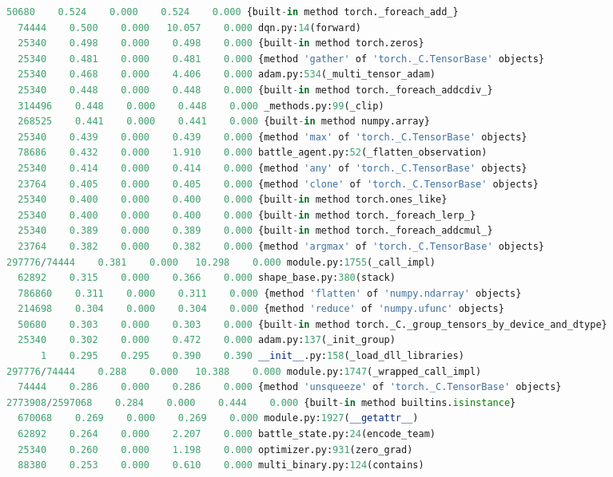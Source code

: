 \begin{changemargin}{-2cm}{-2cm}
\begin{lstlisting}[basicstyle=\fontsize{8}{8}\selectfont\ttfamily,language=Python,caption={Excerpt of custom environment implementation cProfile sorted by time.}]
  50680    0.524    0.000    0.524    0.000 {built-in method torch._foreach_add_}
  74444    0.500    0.000   10.057    0.000 dqn.py:14(forward)
  25340    0.498    0.000    0.498    0.000 {built-in method torch.zeros}
  25340    0.481    0.000    0.481    0.000 {method 'gather' of 'torch._C.TensorBase' objects}
  25340    0.468    0.000    4.406    0.000 adam.py:534(_multi_tensor_adam)
  25340    0.448    0.000    0.448    0.000 {built-in method torch._foreach_addcdiv_}
  314496    0.448    0.000    0.448    0.000 _methods.py:99(_clip)
  268525    0.441    0.000    0.441    0.000 {built-in method numpy.array}
  25340    0.439    0.000    0.439    0.000 {method 'max' of 'torch._C.TensorBase' objects}
  78686    0.432    0.000    1.910    0.000 battle_agent.py:52(_flatten_observation)
  25340    0.414    0.000    0.414    0.000 {method 'any' of 'torch._C.TensorBase' objects}
  23764    0.405    0.000    0.405    0.000 {method 'clone' of 'torch._C.TensorBase' objects}
  25340    0.400    0.000    0.400    0.000 {built-in method torch.ones_like}
  25340    0.400    0.000    0.400    0.000 {built-in method torch._foreach_lerp_}
  25340    0.389    0.000    0.389    0.000 {built-in method torch._foreach_addcmul_}
  23764    0.382    0.000    0.382    0.000 {method 'argmax' of 'torch._C.TensorBase' objects}
297776/74444    0.381    0.000   10.298    0.000 module.py:1755(_call_impl)
  62892    0.315    0.000    0.366    0.000 shape_base.py:380(stack)
  786860    0.311    0.000    0.311    0.000 {method 'flatten' of 'numpy.ndarray' objects}
  214698    0.304    0.000    0.304    0.000 {method 'reduce' of 'numpy.ufunc' objects}
  50680    0.303    0.000    0.303    0.000 {built-in method torch._C._group_tensors_by_device_and_dtype}
  25340    0.302    0.000    0.472    0.000 adam.py:137(_init_group)
      1    0.295    0.295    0.390    0.390 __init__.py:158(_load_dll_libraries)
297776/74444    0.288    0.000   10.388    0.000 module.py:1747(_wrapped_call_impl)
  74444    0.286    0.000    0.286    0.000 {method 'unsqueeze' of 'torch._C.TensorBase' objects}
2773908/2597068    0.284    0.000    0.444    0.000 {built-in method builtins.isinstance}
  670068    0.269    0.000    0.269    0.000 module.py:1927(__getattr__)
  62892    0.264    0.000    2.207    0.000 battle_state.py:24(encode_team)
  25340    0.260    0.000    1.198    0.000 optimizer.py:931(zero_grad)
  88380    0.253    0.000    0.610    0.000 multi_binary.py:124(contains)


\end{lstlisting}
\end{changemargin}
\clearpage
